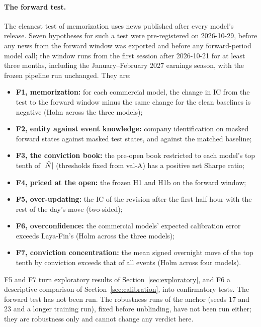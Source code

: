 \paragraph{The forward test.} The cleanest test of memorization uses news published after every model's
release. Seven hypotheses for such a test were pre-registered on 2026-10-29, before any news from the forward
window was exported and before any forward-period model call; the window runs from the first session after
2026-10-21 for at least three months, including the January--February 2027 earnings season, with the frozen
pipeline run unchanged. They are:
\begin{itemize}[leftmargin=*, itemsep=1pt]
\item \textbf{F1, memorization:} for each commercial model, the change in IC from the test to the forward window
  minus the same change for the clean baselines is negative (Holm across the three models);
\item \textbf{F2, entity against event knowledge:} company identification on masked forward states against
  masked test states, and against the matched baseline;
\item \textbf{F3, the conviction book:} the pre-open book restricted to each model's top tenth of $|\hat N|$
  (thresholds fixed from val-A) has a positive net Sharpe ratio;
\item \textbf{F4, priced at the open:} the frozen H1 and H1b on the forward window;
\item \textbf{F5, over-updating:} the IC of the revision after the first half hour with the rest of the day's
  move (two-sided);
\item \textbf{F6, overconfidence:} the commercial models' expected calibration error exceeds Laya-Fin's (Holm
  across the three models);
\item \textbf{F7, conviction concentration:} the mean signed overnight move of the top tenth by conviction
  exceeds that of all events (Holm across four models).
\end{itemize}
F5 and F7 turn exploratory results of Section~\ref{sec:exploratory}, and F6 a descriptive comparison of
Section~\ref{sec:calibration}, into confirmatory tests. The forward test has not been run. The robustness runs of
the anchor (seeds 17 and 23 and a
longer training run), fixed before unblinding, have not been run either; they are robustness only and cannot
change any verdict here.
